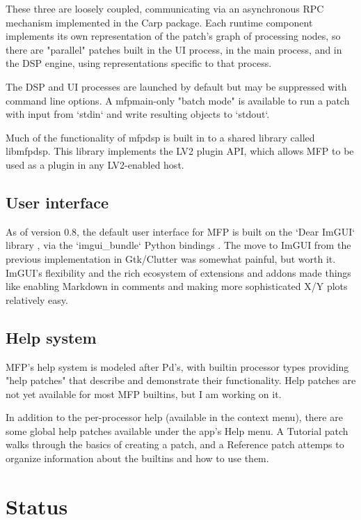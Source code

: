 \documentclass[a4paper]{article}
\begin{document}
These three are loosely coupled, communicating via an
asynchronous RPC mechanism implemented in the Carp
\cite{Gribble:Carp} package. Each runtime component implements
its own representation of the patch's graph of processing nodes,
so there are "parallel" patches built in the UI process, in the
main process, and in the DSP engine, using representations
specific to that process.

The DSP and UI processes are launched by default but may be suppressed
with command line options. A mfpmain-only "batch mode" is available to run
a patch with input from `stdin` and write resulting objects to `stdout`.

Much of the functionality of mfpdsp is built in to a shared
library called libmfpdsp. This library implements the LV2
plugin API, which allows MFP to be used as a plugin in any
LV2-enabled host.

\subsection{User interface}

As of version 0.8, the default user interface for MFP is built on
the `Dear ImGUI` library \cite{DearImGUI}, via the
`imgui\_bundle` Python bindings \cite{ImguiBundle}. The move to
ImGUI from the previous implementation in Gtk/Clutter was somewhat
painful, but worth it. ImGUI's flexibility and the rich ecosystem
of extensions and addons made things like enabling Markdown in
comments and making more sophisticated X/Y plots relatively easy.

\subsection{Help system}

MFP's help system is modeled after Pd's, with builtin processor
types providing "help patches" that describe and demonstrate
their functionality. Help patches are not yet available for most
MFP builtins, but I am working on it.

In addition to the per-processor help (available in the context menu),
there are some global help patches available under the app's Help menu.
A Tutorial patch walks through the basics of creating a patch, and
a Reference patch attemps to organize information about the
builtins and how to use them.

\section{Status}
\end{document}
